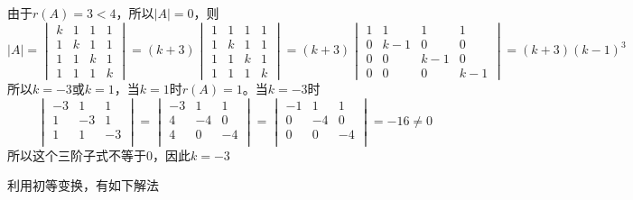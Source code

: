 \begin{solution}
    由于$r(A)=3<4$，所以$|A|=0$，则
    \[
        |A| =
        \begin{vmatrix}
            k & 1 & 1 & 1 \\
            1 & k & 1 & 1 \\
            1 & 1 & k & 1 \\
            1 & 1 & 1 & k
        \end{vmatrix}
        =(k+3)
        \begin{vmatrix}
            1 & 1 & 1 & 1 \\
            1 & k & 1 & 1 \\
            1 & 1 & k & 1 \\
            1 & 1 & 1 & k
        \end{vmatrix}
        =(k+3)
        \begin{vmatrix}
            1 & 1   & 1   & 1   \\
            0 & k-1 & 0   & 0   \\
            0 & 0   & k-1 & 0   \\
            0 & 0   & 0   & k-1
        \end{vmatrix}
        =(k+3)(k-1)^3
    \]
    所以$k=-3$或$k=1$，当$k=1$时$r(A)=1$。当$k=-3$时
    \[
        \begin{vmatrix}
            -3 & 1  & 1  \\
            1  & -3 & 1  \\
            1  & 1  & -3 \\
        \end{vmatrix}
        =
        \begin{vmatrix}
            -3 & 1  & 1  \\
            4  & -4 & 0  \\
            4  & 0  & -4 \\
        \end{vmatrix}
        =
        \begin{vmatrix}
            -1 & 1  & 1  \\
            0  & -4 & 0  \\
            0  & 0  & -4 \\
        \end{vmatrix}
        =-16\neq 0
    \]
    所以这个三阶子式不等于$0$，因此$k=-3$
\end{solution}
利用初等变换，有如下解法
